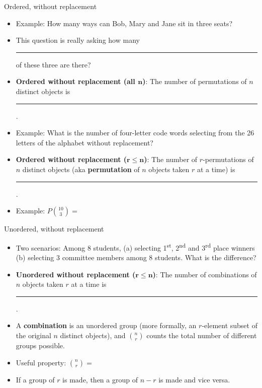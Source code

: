 \documentclass{article}
\newcommand{\blankul}[1]{\rule[-1.5mm]{#1}{0.15mm}}	%
\begin{document}
Ordered, without replacement\bigskip
\begin{itemize}
    \item Example: How many ways can Bob, Mary and Jane sit in three seats?
    \item[] This question is really asking how many \blankul{3cm} of these three are there?\vspace{30pt}
    \item \textbf{Ordered without replacement (all $\boldsymbol{n}$)}: The number of permutations of $n$ distinct objects is \blankul{7cm}.\bigskip\bigskip
    \item Example: What is the number of four-letter code words selecting from the 26 letters of the alphabet without replacement?\vspace{30pt}
    \item \textbf{Ordered without replacement ($\boldsymbol{r \le n}$)}: The number of $r$-permutations of $n$ distinct objects (aka \textbf{permutation} of $n$ objects taken $r$ at a time) is \blankul{2cm}.\vspace{100pt}
    \item[] Example: $P{10 \choose 3} = $
\end{itemize}

\newpage

Unordered, without replacement\bigskip
\begin{itemize}
    \item Two scenarios: Among 8 students, (a) selecting 1\textsuperscript{st}, 2\textsuperscript{nd} and 3\textsuperscript{rd} place winners \\ (b) selecting 3 committee members among 8 students. What is the difference?\vspace{30pt}
    \item \textbf{Unordered without replacement ($\boldsymbol{r \le n}$)}: The number of combinations of $n$ objects taken $r$ at a time is \blankul{4cm}.\vspace{40pt}
    \item[] A \textbf{combination} is an unordered group (more formally, an $r$-element subset of the original $n$ distinct objects), and ${n \choose r}$ counts the total number of different groups possible.\bigskip
    \item Useful property: \hspace{10pt} $\displaystyle {n \choose r} = $
    \item[] If a group of $r$ is made, then a group of $n - r$ is made and vice versa.\end{itemize}\bigskip
\end{document}
